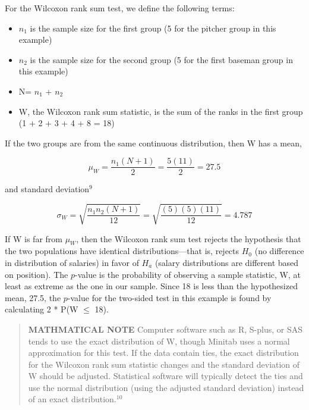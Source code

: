 \documentclass[
]{book}
\providecommand{\tightlist}{%
  \setlength{\itemsep}{0pt}\setlength{\parskip}{0pt}}
\begin{document}
For the Wilcoxon rank sum test, we define the following terms:

\begin{itemize}
\tightlist
\item
  \(n_1\) is the sample size for the first group (5 for the pitcher group in this example)
\item
  \(n_2\) is the sample size for the second group (5 for the first baseman group in this example)
\item
  N= \(n_1\) + \(n_2\)
\item
  W, the Wilcoxon rank sum statistic, is the sum of the ranks in the first group
  (1 + 2 + 3 + 4 + 8 = 18)
\end{itemize}

If the two groups are from the same continuous distribution, then W has a mean,

\begin{equation} 
  \mu_W = \frac{n_1(N+1)}{2} = \frac{5(11)}{2}=27.5
  \tag{1.3} \label{eq:1_3}
\end{equation}

and standard deviation\(^9\)

\begin{equation} 
  \sigma_W = \sqrt{\frac{n_1n_2(N+1)}{12}} = \sqrt{\frac{(5)(5)(11)}{12}}= 4.787
  \tag{1.4} \label{eq:1_4}
\end{equation}

If W is far from \(\mu_W\), then the Wilcoxon rank sum test rejects the hypothesis that the two populations have identical distributions---that is, rejects \(H_0\) (no difference in distribution of salaries) in favor of \(H_a\) (salary distributions are different based on position). The \(p\)-value is the probability of observing a sample statistic, W, at least as extreme as the one in our sample. Since 18 is less than the hypothesized mean, 27.5, the \(p\)-value for the two-sided test in this example is found by calculating 2 * P(W \(\leq\) 18).

\begin{quote}
\textbf{MATHMATICAL NOTE} Computer software such as R, S-plus, or SAS tends to use the exact distribution of W, though Minitab uses a normal approximation for this test. If the data contain ties, the exact distribution for the Wilcoxon rank sum statistic changes and the standard deviation of W should be adjusted. Statistical software will typically detect the ties and use the normal distribution (using the adjusted standard deviation) instead of an exact distribution.\(^{10}\)
\end{quote}
\end{document}
